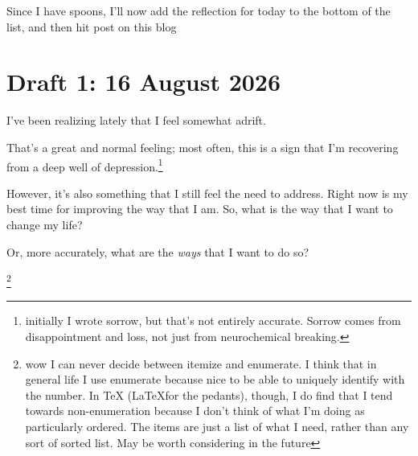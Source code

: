 \documentclass[12pt]{article}
\renewcommand{\,}{\textsuperscript{,}}
\newcommand{\draft}[1]{\section{Draft #1}}
\begin{document}
Since I have spoons, I'll now add the reflection for today to the bottom of the list, and then hit post on this blog

\draft{1: 16 August 2026}

I've been realizing lately that I feel somewhat adrift.

That's a great and normal feeling; most often, this is a sign that I'm recovering from a deep well of depression.\footnote{initially I wrote sorrow, but that's not entirely accurate. Sorrow comes from disappointment and loss, not just from neurochemical breaking.}

However, it's also something that I still feel the need to address.  
Right now is my best time for improving the way that I am.  
So, what is the way that I want to change my life?

Or, more accurately, what are the \textit{ways} that I want to do so?

\footnote{wow I can never decide between itemize and enumerate. I think that in general life I use enumerate because nice to be able to uniquely identify with the number. In TeX (\LaTeX for the pedants), though, I do find that I tend towards non-enumeration because I don't think of what I'm doing as particularly ordered.  
The items are just a list of what I need, rather than any sort of sorted list.  
May be worth considering in the future}
\end{document}
